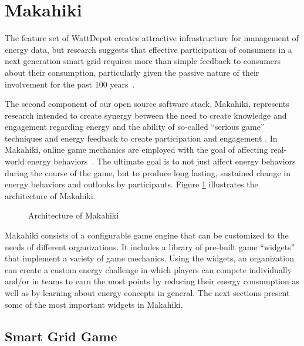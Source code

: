 \section{Makahiki}
The feature set of WattDepot creates attractive infrastructure for management of energy data, but research suggests that effective participation of consumers in a next generation smart grid requires more than simple feedback to consumers about their consumption, particularly given the passive nature of their involvement for the past 100 years~\cite{Froehlich2010-BECC, Houde2013-powermeter, Pierce2012-BEM}.

The second component of our open source software stack, Makahiki, represents research intended to create synergy between the need to create knowledge and engagement regarding energy and the ability of so-called ``serious game'' techniques and energy feedback to create participation and engagement \cite{Deterding2011mt,darby-review-2006,Faruqui09,petersen-dorm-energy-reduction}. In Makahiki, online game mechanics are employed with the goal of affecting real-world energy behaviors~\cite{csdl2-10-07}.  The ultimate goal is to not just affect energy behaviors during the course of the game, but to produce long lasting, sustained change in energy behaviors and outlooks by participants. Figure \ref{fig:makahiki-architecture} illustrates the architecture of Makahiki.

\begin{figure}
\begin{center}
\end{center}
\caption{Architecture of Makahiki}
\label{fig:makahiki-architecture}
\end{figure}

Makahiki consists of a configurable game engine that can be customized to the needs of different organizations.  It includes a library of pre-built game ``widgets'' that implement a variety of game mechanics.  Using the widgets, an organization can create a custom energy challenge in which players can compete individually and/or in teams to earn the most points by reducing their energy consumption as well as by learning about energy concepts in general.  The next sections present some of the most important widgets in Makahiki.

\subsection{Smart Grid Game}

